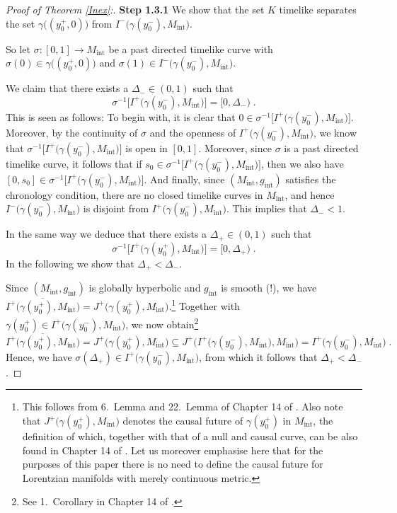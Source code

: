 \documentclass[reqno]{article}
\newcommand{\Mint}{M_{\mathrm{int}}}
\newcommand{\gint}{g_{\mathrm{int}}}
\begin{document}
\begin{proof}[Proof of Theorem \ref{Inex}:]
\textbf{Step 1.3.1}  We show that the set $K$ timelike separates the set $\gamma\big((y^+_0,0)\big)$ from $I^-\big(\gamma(y^-_0),\Mint\big)$.
\vspace*{2mm}

So let $\sigma : [0,1] \to \Mint$ be a past directed timelike curve with $\sigma (0) \in \gamma\big((y^+_0,0)\big)$ and $\sigma(1) \in I^-\big(\gamma(y^-_0),\Mint\big)$. 

\begin{center}
\def\svgwidth{4.8cm}

\end{center}

We claim that there exists a $\Delta_- \in (0,1)$ such that 
\begin{equation*}
\sigma^{-1}\big[I^+\big(\gamma(y^-_0),\Mint\big)\big] = [0,\Delta_-)\;.
\end{equation*} 
This is seen as follows: To begin with, it is clear that $0 \in \sigma^{-1}\big[I^+\big(\gamma(y^-_0),\Mint\big)\big]$. Moreover, by the continuity of $\sigma$ and the openness of $I^+\big(\gamma(y^-_0),\Mint\big)$, we know that $\sigma^{-1}\big[I^+\big(\gamma(y^-_0),\Mint\big)\big]$ is open in $[0,1]$. Moreover, since $\sigma$ is a past directed timelike curve, it follows that if $s_0 \in \sigma^{-1}\big[I^+\big(\gamma(y^-_0),\Mint\big)\big]$, then we also have $[0,s_0] \in \sigma^{-1}\big[I^+\big(\gamma(y^-_0),\Mint\big)\big]$. And finally, since $(\Mint,\gint)$ satisfies the chronology condition, there are no closed timelike curves in $\Mint$, and hence $I^-\big(\gamma(y^-_0),\Mint\big)$ is disjoint from $I^+\big(\gamma(y^-_0),\Mint\big)$. This implies that $\Delta_- <1$.

In the same way we deduce that there exists a $\Delta_+ \in (0,1)$ such that
\begin{equation*}
\sigma^{-1}\big[I^+\big(\gamma(y^+_0),\Mint\big)\big] = [0,\Delta_+)\;.
\end{equation*} 
In the following we show that $\Delta_+ < \Delta_-$.

Since $(\Mint,\gint)$ is globally hyperbolic and $\gint$ is smooth (!), we have $\overline{I^+\big(\gamma(y^+_0),\Mint\big)} = J^+\big(\gamma(y^+_0),\Mint\big)$.\footnote{This follows from 6.\ Lemma and 22.\ Lemma of Chapter 14 of \cite{ONeill}. Also note that $J^+\big(\gamma(y^+_0),\Mint\big)$ denotes the causal future of $\gamma(y^+_0)$ in $\Mint$, the definition of which, together with that of a null and causal curve, can be also found in Chapter 14 of \cite{ONeill}. Let us moreover emphasise here that for the purposes of this paper there is no need to define the causal future for Lorentzian manifolds with merely continuous metric.} Together with $\gamma(y^+_0) \in I^+\big(\gamma(y^-_0),\Mint \big)$, we now obtain\footnote{See 1.\ Corollary in Chapter 14 of \cite{ONeill}.}
\begin{equation*}
\overline{I^+\big(\gamma(y^+_0),\Mint\big)} = J^+\big(\gamma(y^+_0),\Mint\big) \subseteq J^+\Big(I^+\big(\gamma(y^-_0),\Mint\big),\Mint\Big) = I^+\big(\gamma(y^-_0),\Mint\big) \;.
\end{equation*}
Hence, we have $\sigma(\Delta_+) \in I^+\big(\gamma(y^-_0),\Mint\big)$, from which it follows that $\Delta_+ < \Delta_-$.


\end{proof}
\end{document}
